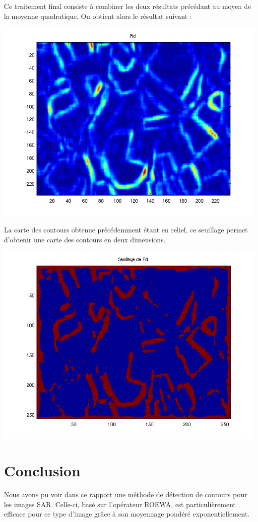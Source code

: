 \documentclass[a4paper,11pt]{article}
\newcommand{\FSource}[1]{%
  
  }
\begin{document}
Ce traitement final consiste à combiner les deux résultats précédant au moyen
de la moyenne quadratique. On obtient alors le résultat suivant :

\includegraphics[width=15cm]{capture4/partie4_07.png}

\FSource{matlab4/4.m}

La carte des contours obtenue précédemment étant en relief, ce seuillage permet
d'obtenir une carte des contours en deux dimensions.

\includegraphics[width=15cm]{capture4/partie4_08.png}


\newpage

\section{Conclusion}
Nous avons pu voir dans ce rapport une méthode de détection de contours pour les
images SAR. Celle-ci, basé sur l'opérateur ROEWA, est particulièrement efficace
pour ce type d'image grâce à son moyennage pondéré exponentiellement.
\end{document}
